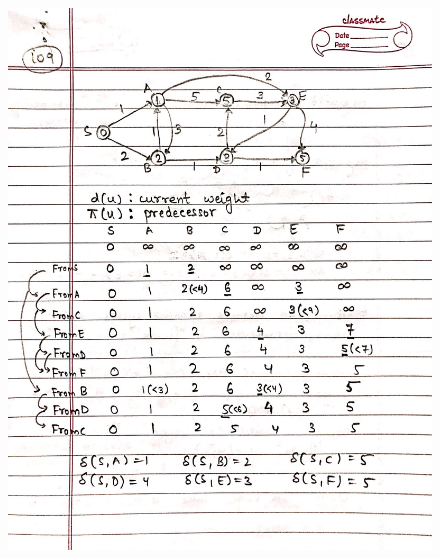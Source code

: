 \begin{figure}[H]
    \centering
    \includegraphics[width=16cm, height=21cm]{"./MIT-6.006/MIT-6006-109"}
\end{figure}
\newpage
